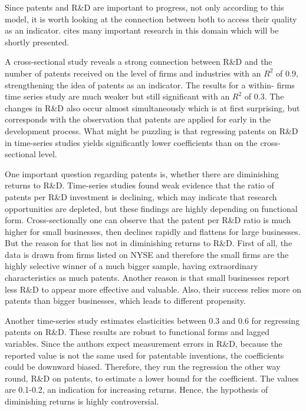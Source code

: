 \documentclass[12pt, a4paper]{scrartcl}
\theoremstyle{definition}
\begin{document}
Since patents and R\&D are important to progress, not only according to this
model, it is worth looking at the connection between both to access their
quality as an indicator. \cite{griliches1990patent} cites many important
research in this domain which will be shortly presented.

A cross-sectional study reveals a strong connection between R\&D and the number
of patents received on the level of firms and industries with an $R^2$ of 0.9,
strengthening the idea of patents as an indicator. The results for a within-
firms time series study are much weaker but still significant with an $R^2$ of
0.3. The changes in R\&D also occur almost simultaneously which is at first
surprising, but corresponds with the observation that patents are applied for
early in the development process. What might be puzzling is that regressing
patents on R\&D in time-series studies yields significantly lower coefficients
than on the cross-sectional level.

One important question regarding patents is, whether there are diminishing
returns to R\&D. Time-series studies found weak evidence that the ratio of
patents per R\&D investment is declining, which may indicate that research
opportunities are depleted, but these findings are highly depending on
functional form. Cross-sectionally one can observe that the patent per R\&D
ratio is much higher for small businesses, then declines rapidly and flattens
for large businesses. But the reason for that lies not in diminishing returns
to R\&D. First of all, the data is drawn from firms listed on NYSE and
therefore the small firms are the highly selective winner of a much bigger
sample, having extraordinary characteristics as much patents. Another reason is
that small businesses report less R\&D to appear more effective and valuable.
Also, their success relies more on patents than bigger businesses, which leads
to different propensity.

Another time-series study estimates elasticities between 0.3 and 0.6 for
regressing patents on R\&D. These results are robust to functional forms and
lagged variables. Since the authors expect measurement errors in R\&D, because
the reported value is not the same used for patentable inventions, the
coefficients could be downward biased. Therefore, they run the regression the
other way round, R\&D on patents, to estimate a lower bound for the
coefficient. The values are 0.1-0.2, an indication for increasing returns.
Hence, the hypothesis of diminishing returns is highly controversial.
\end{document}
